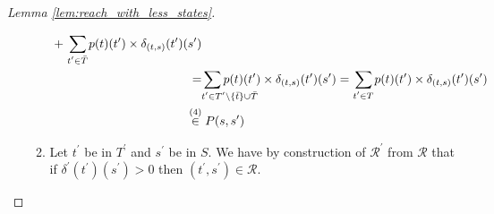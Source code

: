 \documentclass{llncs}
\newcommand{\ssum}[2]{\sum\limits_{\mathclap{#1}^{#2}}}%
\begin{document}
\begin{proof}[Lemma \ref{lem:reach_with_less_states}]
\begin{enumerate}
\begin{enumerate}
\begin{align*}
		\hspace{0.1cm} + \hspace{0.1cm} 
		\ssum{\hspace{0cm}t^\prime \in \bar{T}}{} p(t)(t^\prime) \times  \delta_{(t,s)}(t^{\prime})(s^\prime)
\\
		= &
		\ssum{\hspace{1cm}t^\prime \in T^\prime \setminus \{\bar{t}\} \cup \bar{T}}{} p(t)(t^\prime) \times \delta_{(t,s)}(t^\prime)(s^\prime)
		\hspace{0.1cm} {=} \hspace{0.1cm} 	
		\ssum{\hspace{0cm}t^\prime \in T}{} p(t)(t^\prime) \times \delta_{(t,s)}(t^\prime)(s^\prime)
\\
		\stackrel{(4)}\in & \hspace{0.1cm} 
		P(s, s^\prime)
	\end{align*}
	
		\item Let $t^\prime$ be in $T^\prime$ and $s^\prime$ be in $S$. 
		We have by construction of $\mathcal{R}^\prime$ from $\mathcal{R}$
		that if $\delta^\prime(t^\prime)(s^\prime) > 0$ then $(t^\prime, s^\prime) \in \mathcal{R}$.
	
	\end{enumerate}
	

\end{enumerate}
\end{proof}
\end{document}
